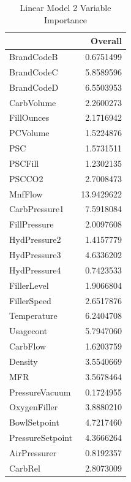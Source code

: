 \documentclass[]{report}
\begin{document}
\begin{table}[H]

\caption{\label{tab:project2a10}Linear Model 2 Variable Importance}
\centering
\begin{tabular}[t]{l|r}
\hline
\textbf{ } & \textbf{Overall}\\
\hline
\rowcolor{gray!6}  BrandCodeB & 0.6751499\\
\hline
BrandCodeC & 5.8589596\\
\hline
\rowcolor{gray!6}  BrandCodeD & 6.5503953\\
\hline
CarbVolume & 2.2600273\\
\hline
\rowcolor{gray!6}  FillOunces & 2.1716942\\
\hline
PCVolume & 1.5224876\\
\hline
\rowcolor{gray!6}  PSC & 1.5731511\\
\hline
PSCFill & 1.2302135\\
\hline
\rowcolor{gray!6}  PSCCO2 & 2.7008473\\
\hline
MnfFlow & 13.9429622\\
\hline
\rowcolor{gray!6}  CarbPressure1 & 7.5918084\\
\hline
FillPressure & 2.0097608\\
\hline
\rowcolor{gray!6}  HydPressure2 & 1.4157779\\
\hline
HydPressure3 & 4.6336202\\
\hline
\rowcolor{gray!6}  HydPressure4 & 0.7423533\\
\hline
FillerLevel & 1.9066804\\
\hline
\rowcolor{gray!6}  FillerSpeed & 2.6517876\\
\hline
Temperature & 6.2404708\\
\hline
\rowcolor{gray!6}  Usagecont & 5.7947060\\
\hline
CarbFlow & 1.6203759\\
\hline
\rowcolor{gray!6}  Density & 3.5540669\\
\hline
MFR & 3.5678464\\
\hline
\rowcolor{gray!6}  PressureVacuum & 0.1724955\\
\hline
OxygenFiller & 3.8880210\\
\hline
\rowcolor{gray!6}  BowlSetpoint & 4.7217460\\
\hline
PressureSetpoint & 4.3666264\\
\hline
\rowcolor{gray!6}  AirPressurer & 0.8192357\\
\hline
CarbRel & 2.8073009\\
\hline
\end{tabular}
\end{table}
\end{document}
